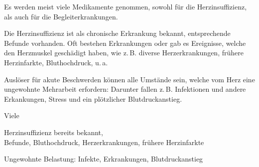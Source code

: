 {{\TxSAMPLER}}
{
\begin{SAMPLERText}
  \item[\SAMPLER{S}] Es werden meist viele Medikamente genommen,
  sowohl für die Herzinsuffizienz, als auch für die
  Begleiterkrankungen.
  \item[\SAMPLER{P}] Die Herzinsuffizienz ist als chronische
  Erkrankung bekannt, entsprechende Befunde vorhanden. Oft
  bestehen Erkrankungen oder gab es Ereignisse, welche
  den Herzmuskel geschädigt haben, wie
  z.\,B. diverse Herzerkrankungen, frühere Herzinfarkte,
  Bluthochdruck, u.\,a.
  \item[\SAMPLER{R}] Auslöser für akute Beschwerden können alle
  Umstände sein, welche vom Herz eine ungewohnte Mehrarbeit
  erfordern: Darunter fallen z.\,B. Infektionen und andere
  Erkankungen, Stress und ein plötzlicher Blutdruckanstieg.
\end{SAMPLERText}
}
{
\begin{SAMPLERSlide}
  \item[\SAMPLER{S}] Viele
  \item[\SAMPLER{P}]  Herzinsuffizienz bereits bekannt,
  \\ Befunde, Bluthochdruck, Herzerkrankungen, frühere
  Herzinfarkte
  \item[\SAMPLER{R}] Ungewohnte Belastung: Infekte,
  Erkrankungen, Blutdruckanstieg
\end{SAMPLERSlide}
}
{}
{}
{}


% 







